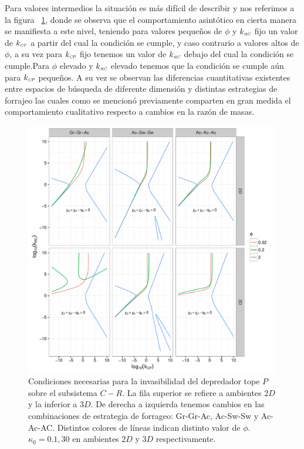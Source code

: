 Para valores intermedios la situaci\'on es m\'as dif\'icil de describir y nos referimos a la figura  ~\ref{fig:NC_PCR}, donde se observa que el comportamiento asint\'otico en cierta manera se manifiesta a este nivel, teniendo para valores peque\~nos de $\phi$ y $k_{\textit{\tiny RC}}$ fijo un valor de $k_{\textit{\tiny CP}}$ a partir del cual la condici\'on se cumple, y caso contrario a valores altos de $\phi$, a su vez para $k_{\textit{\tiny CP}}$ fijo tenemos un valor de $k_{\textit{\tiny RC}}$ debajo del cual la condici\'on se cumple.Para $\phi$ elevado y $k_{\textit{\tiny RC}}$ elevado tenemos que la condici\'on se cumple a\'un para $k_{\textit{\tiny CP}}$ peque\~nos. A su vez se observan las diferencias cuantitativas existentes entre espacios de b\'usqueda de diferente dimensi\'on y distintas estrategias de forrajeo las cuales como se mencion\'o previamente comparten en gran medida el comportamiento cualitativo respecto a cambios en la raz\'on de masas.

\begin{figure}
  \centering
  \includegraphics[width = 0.99\textwidth]{./Plots/NecPCR.pdf}
  \caption[Condiciones Necesarias $P \to C-R$]{Condiciones necesarias para la invasibilidad del depredador tope $P$ sobre el subsistema $C-R$. La fila superior se refiere a ambientes $2D$ y la inferior a $3D$. De derecha a izquierda tenemos cambios en las combinaciones de estrategia de forrageo: Gr-Gr-Ac, Ac-Sw-Sw y Ac-Ac-AC. Distintos colores de l\'ineas indican distinto valor de $\phi$.$\kappa_0= 0.1,30$ en ambientes $2D$ y $3D$ respectivamente. }
  \label{fig:NC_PCR}
\end{figure}

